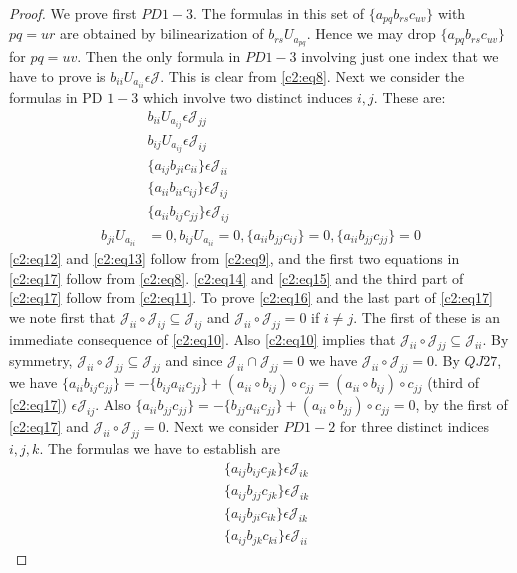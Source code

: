 \begin{proof}
We prove first $PD 1-3$. The formulas in this set of $\{a_{pq}
b_{rs}c_{uv}\}$ with $pq=ur$ are obtained by bilinearization of
$b_{rs}U_{a_{pq}}$. Hence we may drop $\{a_{pq}b_{rs}c_{uv}\}$ for
$pq=uv$. Then the only formula in $PD 1-3$ involving just one index
that we have to prove is $b_{ii}U_{a_{ii}}\epsilon \mathscr{J}$. This
is clear from \eqref{c2:eq8}. Next we consider the formulas in PD $1-3$ which
involve two distinct induces $i,j$. These are:\pageoriginale
\begin{align*}
&b_{ii}U_{a_{ij}}\epsilon \mathscr{J}_{jj}\tag{12}\label{c2:eq12}\\
&b_{ij}U_{a_{ij}}\epsilon \mathscr{J}_{ij}\tag{13}\label{c2:eq13}\\
&\{a_{ij}b_{ji}c_{ii}\}\epsilon \mathscr{J}_{ii}\tag{14}\label{c2:eq14}\\
&\{a_{ii}b_{ii}c_{ij}\}\epsilon \mathscr{J}_{ij}\tag{15}\label{c2:eq15}\\
&\{a_{ii}b_{ij}c_{jj}\}\epsilon\mathscr{J}_{ij}\tag{16}\label{c2:eq16}\\
b_{ji}U_{a_{ii}}&=0,b_{ij}U_{a_{ii}}=0, \{a_{ii}b_{jj}c_{ij}\}=0,\{a_{ii}b_{jj}c_{jj}\}=0\tag{17}\label{c2:eq17}
\end{align*}
\eqref{c2:eq12} and \eqref{c2:eq13} follow from \eqref{c2:eq9}, and
the first two equations in 
\eqref{c2:eq17} follow from \eqref{c2:eq8}. \eqref{c2:eq14} and
\eqref{c2:eq15} and the third part of
\eqref{c2:eq17} follow from \eqref{c2:eq11}. To prove \eqref{c2:eq16}
and the last part of \eqref{c2:eq17} 
we note first that $\mathscr{J}_{ii}\circ \mathscr{J}_{ij}\subseteq
\mathscr{J}_{ij}$ and $\mathscr{J}_{ii}\circ \mathscr{J}_{jj}=0$ if
$i\neq j$. The first of these is an immediate consequence of
\eqref{c2:eq10}. Also \eqref{c2:eq10} implies that $\mathscr{J}_{ii}\circ
\mathscr{J}_{jj}\subseteq \mathscr{J}_{ii}$. By symmetry,
$\mathscr{J}_{ii}\circ \mathscr{J}_{jj}\subseteq \mathscr{J}_{jj}$ and
since $\mathscr{J}_{ii}\cap \mathscr{J}_{jj}=0$ we have
$\mathscr{J}_{ii}\circ \mathscr{J}_{jj}=0$. By $QJ 27$, we have
$\{a_{ii}b_{ij}c_{jj}\}=-\{b_{ij}a_{ii}c_{jj}\}+(a_{ii}\circ
b_{ij})\circ c_{jj}=(a_{ii}\circ b_{ij})\circ c_{jj}$ (third of \eqref{c2:eq17})
$\epsilon \mathscr{J}_{ij}$. Also
$\{a_{ii}b_{jj}c_{jj}\}=-\{b_{jj}a_{ii}c_{jj}\}+(a_{ii}\circ
b_{jj})\circ c_{jj}=0$, by the first of \eqref{c2:eq17} and
$\mathscr{J}_{ii}\circ \mathscr{J}_{jj}=0$. Next we consider $PD 1-2$
for three distinct indices $i,j,k$. The formulas we have to establish
are
\begin{align*}
&\{a_{ij}b_{ij}c_{jk}\}\epsilon\mathscr{J}_{ik}\tag{18}\label{c2:eq18}\\
&\{a_{ij}b_{jj}c_{jk}\}\epsilon\mathscr{J}_{ik}\tag{19}\label{c2:eq19}\\
&\{a_{ij}b_{ji}c_{ik}\}\epsilon \mathscr{J}_{ik}\tag{20}\label{c2:eq20}\\
&\{a_{ij}b_{jk}c_{ki}\}\epsilon \mathscr{J}_{ii}\tag{21}\label{c2:eq21}
\end{align*}


\end{proof}
